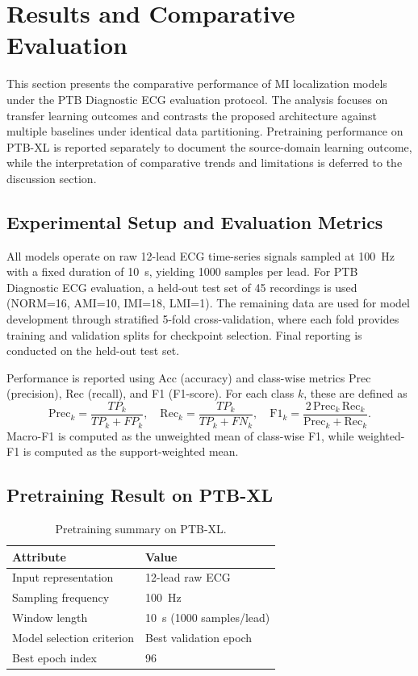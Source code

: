\documentclass[preprint,12pt]{elsarticle}
\begin{document}
\section{Results and Comparative Evaluation}
This section presents the comparative performance of MI localization models under the PTB Diagnostic ECG evaluation protocol. The analysis focuses on transfer learning outcomes and contrasts the proposed architecture against multiple baselines under identical data partitioning. Pretraining performance on PTB-XL is reported separately to document the source-domain learning outcome, while the interpretation of comparative trends and limitations is deferred to the discussion section.

\subsection{Experimental Setup and Evaluation Metrics}
All models operate on raw 12-lead ECG time-series signals sampled at 100~Hz with a fixed duration of 10~s, yielding 1000 samples per lead. For PTB Diagnostic ECG evaluation, a held-out test set of 45 recordings is used (NORM=16, AMI=10, IMI=18, LMI=1). The remaining data are used for model development through stratified 5-fold cross-validation, where each fold provides training and validation splits for checkpoint selection. Final reporting is conducted on the held-out test set.

Performance is reported using Acc (accuracy) and class-wise metrics Prec (precision), Rec (recall), and F1 (F1-score). For each class $k$, these are defined as
\begin{equation}
\mathrm{Prec}_k=\frac{TP_k}{TP_k+FP_k},\quad
\mathrm{Rec}_k=\frac{TP_k}{TP_k+FN_k},\quad
\mathrm{F1}_k=\frac{2\,\mathrm{Prec}_k\,\mathrm{Rec}_k}{\mathrm{Prec}_k+\mathrm{Rec}_k}.
\end{equation}
Macro-F1 is computed as the unweighted mean of class-wise F1, while weighted-F1 is computed as the support-weighted mean.



\subsection{Pretraining Result on PTB-XL}
\begin{table}[!h]
\centering
\caption{Pretraining summary on PTB-XL.}
\label{tab:pretrain_summary}
\footnotesize
\begin{tabular}{p{3.6cm}p{3.2cm}}
\toprule
\textbf{Attribute} & \textbf{Value} \\
\midrule
Input representation & 12-lead raw ECG \\
Sampling frequency & 100~Hz \\
Window length & 10~s (1000 samples/lead) \\
Model selection criterion & Best validation epoch \\
Best epoch index & 96 \\
\bottomrule
\end{tabular}
\end{table}
\end{document}
